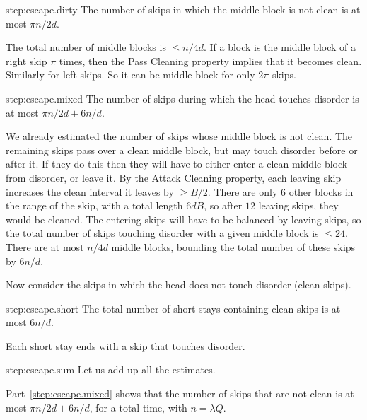 \documentclass[11pt]{memoir}
\theoremstyle{definition} %
\renewcommand{\le}{\leq}
\renewcommand{\ge}{\geq}
\def\B{B}
\renewcommand{\d}{d}
\newcommand{\passno}{\pi}
\newcommand{\Q}{Q} %
\begin{document}
\begin{Proof}
\begin{step+}{step:escape.dirty}
  The number of skips in which the middle block is not clean is at most \(  \passno n/2\d \).
\end{step+}
\begin{pproof}
  The total number of middle blocks is \( \le n/4\d \).
  If a block is the middle block of a right skip \( \passno \) times,
  then the Pass Cleaning property implies that it becomes clean.
  Similarly for left skips.
  So it can be middle block for only \( 2\passno \) skips.
\end{pproof} %
\begin{step+}{step:escape.mixed}
  The number of skips during which the head touches disorder is at most
\( \passno n/2\d + 6 n/\d \).  
\end{step+}
\begin{pproof}
  We already estimated the number of skips whose middle block is not clean.
  The remaining skips pass over a clean middle block, but may touch disorder before
  or after it.
  If they do this then they will have to either enter a clean middle block from disorder,
  or leave it.
  By the Attack Cleaning property, each leaving skip increases the clean interval
  it leaves by \( \ge\B/2 \).
  There are only 6 other blocks in the range of the skip, with a total length \( 6d\B \),
  so after \( 12 \) leaving skips, they would be cleaned.
  The entering skips will have to be balanced by leaving skips,
  so the total number of skips touching disorder with a given middle block is \( \le 24 \).
  There are at most \( n/4\d \) middle blocks, bounding the total number of
  these skips by \( 6 n/\d \).
\end{pproof} %

Now consider the skips in which the head does not touch disorder (clean skips).

\begin{step+}{step:escape.short}
  The total number of short stays containing clean skips is at most \( 6 n/\d \).
\end{step+}
\begin{pproof}
  Each short stay ends with a skip that touches disorder.
\end{pproof} %

\begin{step+}{step:escape.sum}
Let us add up all the estimates.
\end{step+}
\begin{prooof}
  Part~\ref {step:escape.mixed} shows that the number of skips
  that are not clean is at most \( \passno n/2\d + 6n/\d \),
  for a total time, with \( n=\lambda\Q \).
  

\end{prooof}
\end{Proof}
\end{document}
